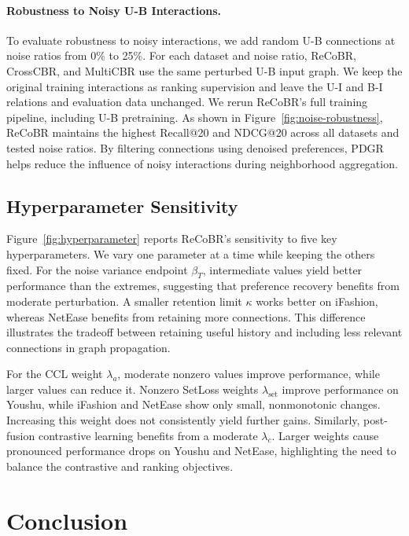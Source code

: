 \documentclass[letterpaper]{article}
\begin{document}
\paragraph{Robustness to Noisy U-B Interactions.}
To evaluate robustness to noisy interactions, we add random
U-B connections at noise ratios from 0\% to 25\%.
For each dataset and noise ratio, ReCoBR, CrossCBR, and
MultiCBR use the same perturbed U-B input graph.
We keep the original training interactions as ranking supervision
and leave the U-I and B-I relations and evaluation data unchanged.
We rerun ReCoBR's full training pipeline, including U-B pretraining.
As shown in Figure~\ref{fig:noise-robustness}, ReCoBR maintains
the highest Recall@20 and NDCG@20 across all datasets and
tested noise ratios. By filtering connections using denoised
preferences, PDGR helps reduce the influence of noisy interactions
during neighborhood aggregation.







\subsection{Hyperparameter Sensitivity}

Figure~\ref{fig:hyperparameter} reports ReCoBR's sensitivity
to five key hyperparameters. We vary one parameter at a time
while keeping the others fixed. For the noise variance endpoint
$\beta_T$, intermediate values yield better performance than
the extremes, suggesting that preference recovery benefits
from moderate perturbation. A smaller retention limit $\kappa$
works better on iFashion, whereas NetEase benefits from
retaining more connections. This difference illustrates the
tradeoff between retaining useful history and including less
relevant connections in graph propagation.

For the CCL weight $\lambda_a$, moderate nonzero values improve
performance, while larger values can reduce it. Nonzero
SetLoss weights $\lambda_{\mathrm{set}}$ improve performance
on Youshu, while iFashion and NetEase show only small,
nonmonotonic changes. Increasing this weight does not
consistently yield further gains. Similarly, post-fusion
contrastive learning benefits from a moderate $\lambda_c$.
Larger weights cause pronounced performance drops on Youshu
and NetEase, highlighting the need to balance the contrastive
and ranking objectives.



\section{Conclusion}
\end{document}
